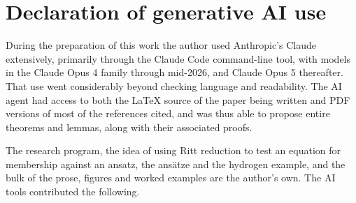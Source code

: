 \documentclass{article}
\theoremstyle{definition}
\theoremstyle{plain}
\begin{document}
\vfill\eject
\section*{Declaration of generative AI use}

During the preparation of this work the author used Anthropic's Claude
extensively, primarily through the Claude Code command-line tool, with models in the
Claude Opus 4 family through mid-2026, and Claude Opus 5 thereafter.
That use went considerably beyond checking language and readability.
The AI agent had access to both the LaTeX source of the paper being written and PDF versions of most
of the references cited, and was thus able to propose entire
theorems and lemmas, along with their associated proofs.

The research program, the idea of using Ritt reduction to test an equation for membership against an ansatz,
the ans\"atze and the hydrogen example, and the bulk of
the prose, figures and worked examples are the author's own.  The AI tools
contributed the following.
\end{document}
